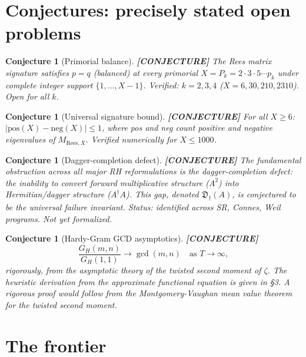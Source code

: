 \documentclass[11pt]{article}
\newtheorem{conjecture}[theorem]{Conjecture}
\theoremstyle{remark}
\newcommand{\CONJECTURE}{\textbf{\color{violet}[CONJECTURE]}}
\begin{document}
\section{Conjectures: precisely stated open problems}

\begin{conjecture}[Primorial balance] \CONJECTURE{}
The Rees matrix signature satisfies $p = q$ (balanced) at every primorial $X = P_k = 2 \cdot 3 \cdot 5 \cdots p_k$
under complete integer support $\{1, \ldots, X-1\}$.
Verified: $k = 2, 3, 4$ ($X = 6, 30, 210, 2310$). Open for all $k$.
\end{conjecture}

\begin{conjecture}[Universal signature bound] \CONJECTURE{}
For all $X \geq 6$: $|\text{pos}(X) - \text{neg}(X)| \leq 1$,
where pos and neg count positive and negative eigenvalues of $M_{\mathrm{Rees},X}$.
Verified numerically for $X \leq 1000$.
\end{conjecture}

\begin{conjecture}[Dagger-completion defect] \CONJECTURE{}
The fundamental obstruction across all major RH reformulations is the
\emph{dagger-completion defect}: the inability to convert forward multiplicative
structure ($A^2$) into Hermitian/dagger structure ($A^\dagger A$).
This gap, denoted $\mathfrak{D}_\dagger(A)$, is conjectured to be the universal failure invariant.
Status: identified across SR, Connes, Weil programs. Not yet formalized.
\end{conjecture}

\begin{conjecture}[Hardy-Gram GCD asymptotics] \CONJECTURE{}
\[
\frac{G_H(m,n)}{G_H(1,1)} \to \gcd(m,n) \quad \text{as } T \to \infty,
\]
rigorously, from the asymptotic theory of the twisted second moment of $\zeta$.
The heuristic derivation from the approximate functional equation is given in \S3.
A rigorous proof would follow from the Montgomery-Vaughan mean value theorem
for the twisted second moment.
\end{conjecture}

\section{The frontier}
\end{document}
